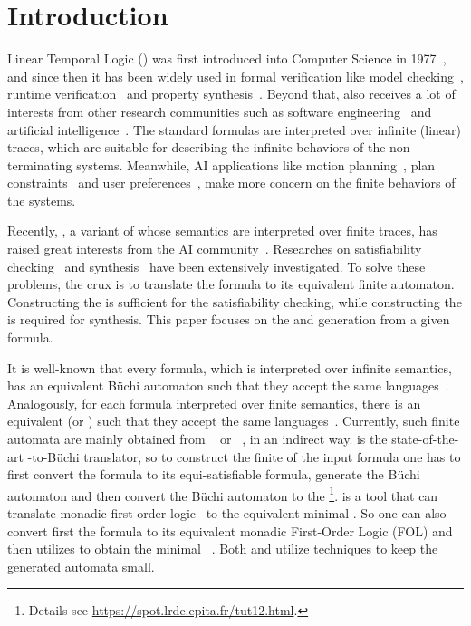 \section{Introduction}

Linear Temporal Logic (\ltl) was first introduced into Computer Science in 1977~\cite{Pnu77}, and since then it has been widely used in formal verification like model checking~\cite{CGD99}, runtime verification~\cite{BLS11} and property synthesis~\cite{JGWB07,BFJ12}. Beyond that, \ltl also receives a lot of interests from other research communities such as software engineering~\cite{BKMR15} and artificial intelligence~\cite{BK98}. The standard \ltl formulas are interpreted over infinite (linear) traces, which are suitable for describing the infinite behaviors of the non-terminating systems. Meanwhile, AI applications like motion planning~\cite{BK98,DV99,CDV02,PLGG11,CBMM17}, plan constraints~\cite{BK00,Gab04} and user preferences~\cite{BFM06,BFM11,SBM11}, make more concern on the finite behaviors of the systems. 

Recently, \ltlf, a variant of \ltl whose semantics are interpreted over finite traces, has raised great interests from the AI community~\cite{GV13,GV15}. Researches on \ltlf satisfiability checking~\cite{LZPVH14,LRPZV19} and \ltlf synthesis~\cite{GV15,ZTLPV17,CMBM18} have been extensively investigated. To solve these problems, the crux is to translate the \ltlf formula to its equivalent finite automaton. Constructing the \NFA is sufficient for the satisfiability checking, while constructing the \DFA is required for \ltlf synthesis. This paper focuses on the \NFA and \DFA generation from a given \ltlf formula. 

It is well-known that every \ltl formula, which is interpreted over infinite semantics, has an equivalent B\"uchi automaton such that they accept the same languages~\cite{GPVW95}. Analogously, for each \ltlf formula interpreted over finite semantics, there is an equivalent \NFA (or \DFA) such that they accept the same languages~\cite{GV15}. Currently, such finite automata are mainly obtained from \spot~\cite{DP04} or \mona~\cite{HJJKPRS95,EKM98}, in an indirect way. \spot is the state-of-the-art \ltl-to-B\"uchi translator, so to construct the finite \NFA of the input \ltlf formula one has to first convert the \ltlf formula to its equi-satisfiable \ltl formula, generate the B\"uchi automaton and then convert the B\"uchi automaton to the \NFA\footnote{Details see \url{https://spot.lrde.epita.fr/tut12.html}.}. \mona is a tool that can translate monadic first-order logic~\cite{Tra62} to the equivalent minimal \DFA. So one can also convert first the \ltlf formula to its equivalent monadic First-Order Logic (FOL) and then utilizes \mona to obtain the minimal \DFA~\cite{ZTLPV17}. Both \spot and \mona utilize \BDD techniques to keep the generated automata small. 

